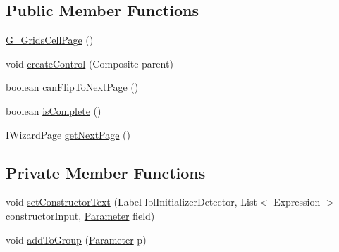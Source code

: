 \subsection*{Public Member Functions}
\begin{DoxyCompactItemize}
\item 
\hyperlink{classit_1_1isislab_1_1masonassisteddocumentation_1_1mason_1_1wizards_1_1_g___grids_cell_page_a5b9622d67897a4f649774e4d4fee35fb}{G\-\_\-\-Grids\-Cell\-Page} ()
\item 
void \hyperlink{classit_1_1isislab_1_1masonassisteddocumentation_1_1mason_1_1wizards_1_1_g___grids_cell_page_a4106a1cabad49a1567519f488e5b10ba}{create\-Control} (Composite parent)
\item 
boolean \hyperlink{classit_1_1isislab_1_1masonassisteddocumentation_1_1mason_1_1wizards_1_1_g___grids_cell_page_aaa89c6412c2a481f38b684a8d164180f}{can\-Flip\-To\-Next\-Page} ()
\item 
boolean \hyperlink{classit_1_1isislab_1_1masonassisteddocumentation_1_1mason_1_1wizards_1_1_g___grids_cell_page_a3f953902c51fceac7974fede28cca0e3}{is\-Complete} ()
\item 
I\-Wizard\-Page \hyperlink{classit_1_1isislab_1_1masonassisteddocumentation_1_1mason_1_1wizards_1_1_g___grids_cell_page_a5cc85245438934488271fbc25e65387e}{get\-Next\-Page} ()
\end{DoxyCompactItemize}
\subsection*{Private Member Functions}
\begin{DoxyCompactItemize}
\item 
void \hyperlink{classit_1_1isislab_1_1masonassisteddocumentation_1_1mason_1_1wizards_1_1_g___grids_cell_page_ad9069cbfc289b5549376270b2bc35c21}{set\-Constructor\-Text} (Label lbl\-Initializer\-Detector, List$<$ Expression $>$ constructor\-Input, \hyperlink{classit_1_1isislab_1_1masonassisteddocumentation_1_1mason_1_1analizer_1_1_parameter}{Parameter} field)
\item 
void \hyperlink{classit_1_1isislab_1_1masonassisteddocumentation_1_1mason_1_1wizards_1_1_g___grids_cell_page_a874d5aab262342b54eb0bd9ea0e576ab}{add\-To\-Group} (\hyperlink{classit_1_1isislab_1_1masonassisteddocumentation_1_1mason_1_1analizer_1_1_parameter}{Parameter} p)
\end{DoxyCompactItemize}
